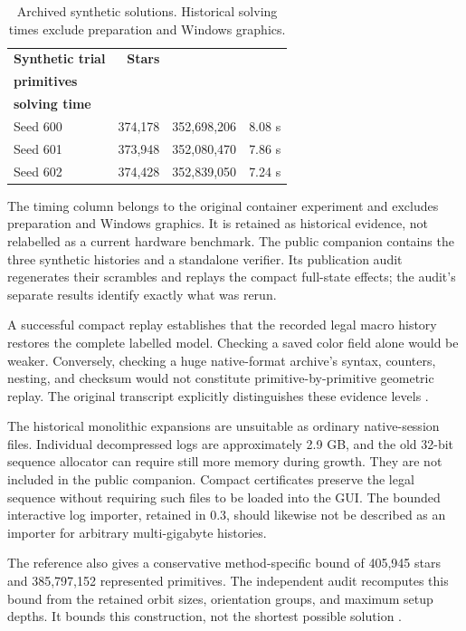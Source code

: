 \documentclass[a4paper,11pt]{article}
\begin{document}
\begin{table}[htbp]
\centering
\small
\caption{Archived synthetic solutions. Historical solving times exclude preparation and Windows graphics.}
\label{tab:synthetic-solves}
\begin{tabularx}{\linewidth}{@{}Xrrr@{}}
\toprule
\textbf{Synthetic trial} & \textbf{Stars} & \shortstack[r]{\textbf{Represented solution}\\\textbf{primitives}} & \shortstack[r]{\textbf{Historical headless}\\\textbf{solving time}} \\
\midrule
Seed 600 & 374,178 & 352,698,206 & 8.08 s \\
Seed 601 & 373,948 & 352,080,470 & 7.86 s \\
Seed 602 & 374,428 & 352,839,050 & 7.24 s \\
\bottomrule
\end{tabularx}
\end{table}

The timing column belongs to the original container experiment and excludes preparation and Windows graphics. It is retained as historical evidence, not relabelled as a current hardware benchmark. The public companion contains the three synthetic histories and a standalone verifier. Its publication audit regenerates their scrambles and replays the compact full-state effects; the audit's separate results identify exactly what was rerun.

A successful compact replay establishes that the recorded legal macro history restores the complete labelled model. Checking a saved color field alone would be weaker. Conversely, checking a huge native-format archive's syntax, counters, nesting, and checksum would not constitute primitive-by-primitive geometric replay. The original transcript explicitly distinguishes these evidence levels \cite[pp.~25--30]{transcript}.

The historical monolithic expansions are unsuitable as ordinary native-session files. Individual decompressed logs are approximately 2.9 GB, and the old 32-bit sequence allocator can require still more memory during growth. They are not included in the public companion. Compact certificates preserve the legal sequence without requiring such files to be loaded into the GUI. The bounded interactive log importer, retained in 0.3, should likewise not be described as an importer for arbitrary multi-gigabyte histories.

The reference also gives a conservative method-specific bound of 405,945 stars and 385,797,152 represented primitives. The independent audit recomputes this bound from the retained orbit sizes, orientation groups, and maximum setup depths. It bounds this construction, not the shortest possible solution \cite{algorithms}.
\end{document}
